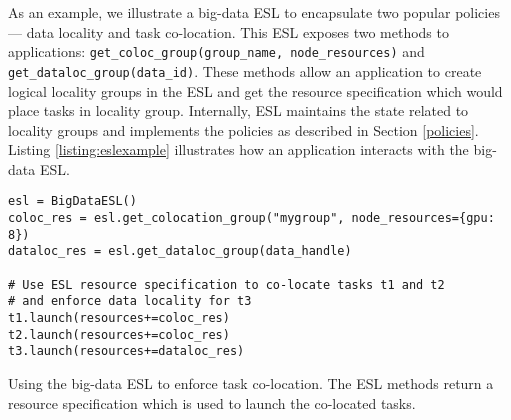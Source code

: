 \begin{sloppypar}
As an example, we illustrate a big-data ESL to encapsulate two popular policies --- data locality and task co-location. This ESL exposes two methods to applications: \lstinline[breaklines=true]{get_coloc_group(group_name, node_resources)} and \lstinline[breaklines=true]{get_dataloc_group(data_id)}. 
These methods allow an application to create logical locality groups in the ESL and get the resource specification which would place tasks in locality group. Internally, ESL maintains the state related to locality groups and implements the policies as described in Section \ref{policies}. Listing \ref{listing:eslexample} illustrates how an application interacts with the big-data ESL.
\end{sloppypar}

\begin{listing}
\begin{verbatim}
esl = BigDataESL()
coloc_res = esl.get_colocation_group("mygroup", node_resources={gpu: 8})
dataloc_res = esl.get_dataloc_group(data_handle)

# Use ESL resource specification to co-locate tasks t1 and t2
# and enforce data locality for t3
t1.launch(resources+=coloc_res)
t2.launch(resources+=coloc_res)
t3.launch(resources+=dataloc_res)
\end{verbatim}
\caption{Using the big-data ESL to enforce task co-location. The ESL methods return a resource specification which is used to launch the co-located tasks.}
\label{listing:eslexample}
\end{listing}


